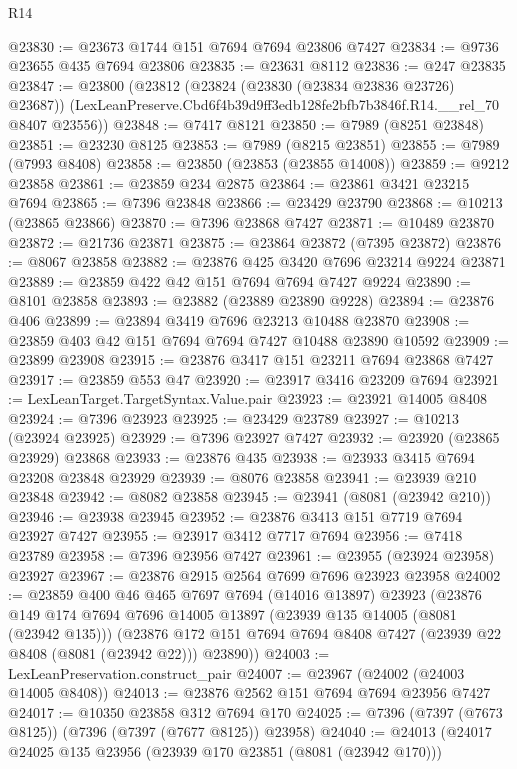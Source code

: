 \begin{lexlean}{R14}
\begin{coremodule}
@23830 := @23673 @1744 @151 @7694 @7694 @23806 @7427
@23834 := @9736 @23655 @435 @7694 @23806
@23835 := @23631 @8112
@23836 := @247 @23835
@23847 := @23800
    (@23812
      (@23824 (@23830 (@23834 @23836 @23726) @23687))
      (LexLeanPreserve.Cbd6f4b39d9ff3edb128fe2bfb7b3846f.R14.__rel_70 @8407 @23556))
@23848 := @7417 @8121
@23850 := @7989 (@8251 @23848)
@23851 := @23230 @8125
@23853 := @7989 (@8215 @23851)
@23855 := @7989 (@7993 @8408)
@23858 := @23850 (@23853 (@23855 @14008))
@23859 := @9212 @23858
@23861 := @23859 @234 @2875
@23864 := @23861 @3421 @23215 @7694
@23865 := @7396 @23848
@23866 := @23429 @23790
@23868 := @10213 (@23865 @23866)
@23870 := @7396 @23868 @7427
@23871 := @10489 @23870
@23872 := @21736 @23871
@23875 := @23864 @23872 (@7395 @23872)
@23876 := @8067 @23858
@23882 := @23876 @425 @3420 @7696 @23214 @9224 @23871
@23889 := @23859 @422 @42 @151 @7694 @7694 @7427 @9224
@23890 := @8101 @23858
@23893 := @23882 (@23889 @23890 @9228)
@23894 := @23876 @406
@23899 := @23894 @3419 @7696 @23213 @10488 @23870
@23908 := @23859 @403 @42 @151 @7694 @7694 @7427 @10488 @23890 @10592
@23909 := @23899 @23908
@23915 := @23876 @3417 @151 @23211 @7694 @23868 @7427
@23917 := @23859 @553 @47
@23920 := @23917 @3416 @23209 @7694
@23921 := LexLeanTarget.TargetSyntax.Value.pair
@23923 := @23921 @14005 @8408
@23924 := @7396 @23923
@23925 := @23429 @23789
@23927 := @10213 (@23924 @23925)
@23929 := @7396 @23927 @7427
@23932 := @23920 (@23865 @23929) @23868
@23933 := @23876 @435
@23938 := @23933 @3415 @7694 @23208 @23848 @23929
@23939 := @8076 @23858
@23941 := @23939 @210 @23848
@23942 := @8082 @23858
@23945 := @23941 (@8081 (@23942 @210))
@23946 := @23938 @23945
@23952 := @23876 @3413 @151 @7719 @7694 @23927 @7427
@23955 := @23917 @3412 @7717 @7694
@23956 := @7418 @23789
@23958 := @7396 @23956 @7427
@23961 := @23955 (@23924 @23958) @23927
@23967 := @23876 @2915 @2564 @7699 @7696 @23923 @23958
@24002 := @23859
    @400
    @46
    @465
    @7697
    @7694
    (@14016 @13897)
    @23923
    (@23876
      @149
      @174
      @7694
      @7696
      @14005
      @13897
      (@23939 @135 @14005 (@8081 (@23942 @135)))
      (@23876 @172 @151 @7694 @7694 @8408 @7427 (@23939 @22 @8408 (@8081 (@23942 @22))) @23890))
@24003 := LexLeanPreservation.construct_pair
@24007 := @23967 (@24002 (@24003 @14005 @8408))
@24013 := @23876 @2562 @151 @7694 @7694 @23956 @7427
@24017 := @10350 @23858 @312 @7694 @170
@24025 := @7396 (@7397 (@7673 @8125)) (@7396 (@7397 (@7677 @8125)) @23958)
@24040 := @24013
    (@24017
      @24025
      @135
      @23956
      (@23939 @170 @23851 (@8081 (@23942 @170)))

\end{coremodule}
\end{lexlean}
